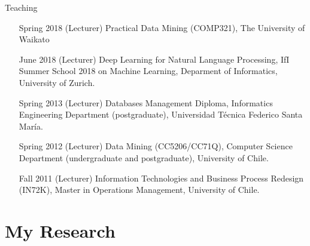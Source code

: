 \documentclass[handout]{beamer}
\begin{document}
\begin{frame}{Teaching}
\begin{scriptsize}
  \begin{enumerate}
\item [Spring 2018] (Lecturer) Practical Data Mining (COMP321), The University of Waikato

\item [June 2018] (Lecturer) Deep Learning for Natural Language Processing, IfI Summer School 2018 on Machine Learning,  Deparment of Informatics, University of Zurich. 

\item[Spring 2013] (Lecturer) Databases Management Diploma, Informatics Engineering Department (postgraduate), Universidad Técnica Federico Santa María.

\item[Spring 2012] (Lecturer) Data Mining (CC5206/CC71Q), Computer Science Department (undergraduate and postgraduate), University of Chile.

\item[Fall 2011]   (Lecturer) Information Technologies and Business Process Redesign (IN72K), Master in Operations Management, University of Chile.
  \end{enumerate} 
\end{scriptsize}

\end{frame}






\section{My Research}
\end{document}

